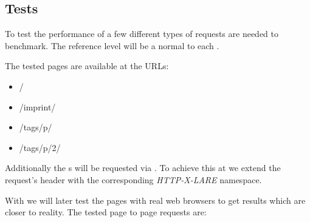 \subsection{Tests}

To test the performance of \lare{} a few different types of requests are needed to benchmark.
The reference level will be a normal \httpRequest{} to each \webPage{}.

The tested pages are available at the URLs:

\begin{itemize}
\item /
\item /imprint/
\item /tags/p/
\item /tags/p/2/
\end{itemize}

Additionally the \webPage{}s will be requested via \lare{}.
To achieve this at \curl{} we extend the request's header with the corresponding \emph{HTTP-X-LARE} namespace.

With \selenium{} we will later test the pages with real web browsers to get results which are closer to reality.
The tested page to page requests are:

